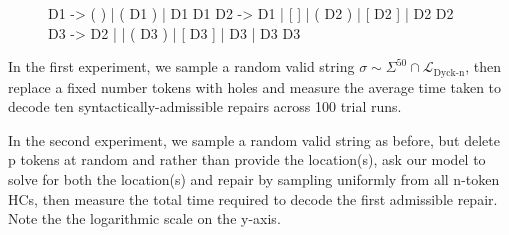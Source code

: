 \documentclass[sigplan,nonacm]{acmart}\settopmatter{printfolios=false,printccs=false,printacmref=false}
\begin{document}
\begin{figure}[H]
\begin{tidyinput}
D1 -> ( ) | ( D1 ) | D1 D1
D2 -> D1 | [ ] | ( D2 ) | [ D2 ] | D2 D2
D3 -> D2 | { } | ( D3 ) | [ D3 ] | { D3 } | D3 D3
\end{tidyinput}
\end{figure}

\noindent In the first experiment, we sample a random valid string $\sigma \sim \Sigma^{50} \cap \mathcal{L}_{\text{Dyck-n}}$, then replace a fixed number tokens with holes and measure the average time taken to decode ten syntactically-admissible repairs across 100 trial runs.

\begin{figure}[H]
\hspace{-0.25cm}
\end{figure}

\noindent In the second experiment, we sample a random valid string as before, but delete p tokens at random and rather than provide the location(s), ask our model to solve for both the location(s) and repair by sampling uniformly from all n-token HCs, then measure the total time required to decode the first admissible repair. Note the the logarithmic scale on the y-axis.
\end{document}
